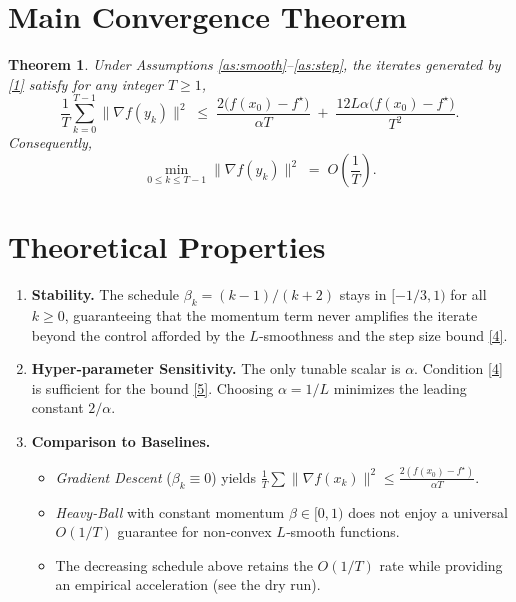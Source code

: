 \documentclass[11pt]{article}
\newtheorem{theorem}{Theorem}
\begin{document}
\section*{Main Convergence Theorem}
\begin{theorem}\label{thm:main}
Under Assumptions \ref{as:smooth}–\ref{as:step}, the iterates generated by \eqref{1} satisfy for any integer $T\ge1$,
\[
\frac{1}{T}\sum_{k=0}^{T-1}\bigl\|\nabla f(y_k)\bigr\|^{2}
\;\le\;
\frac{2\bigl(f(x_0)-f^\star\bigr)}{\alpha T}
\;+\;
\frac{12L\alpha\bigl(f(x_0)-f^\star\bigr)}{T^{2}} .
\tag{5}
\]
Consequently,
\[
\min_{0\le k\le T-1}\bigl\|\nabla f(y_k)\bigr\|^{2}
\;=\;O\!\left(\frac{1}{T}\right).
\]
\end{theorem}

\section*{Theoretical Properties}
\begin{enumerate}[label=\arabic*.]
\item \textbf{Stability.} The schedule $\beta_k=(k-1)/(k+2)$ stays in $[-1/3,1)$ for all $k\ge0$, guaranteeing that the momentum term never amplifies the iterate beyond the control afforded by the $L$‑smoothness and the step size bound \eqref{4}.

\item \textbf{Hyper‑parameter Sensitivity.} The only tunable scalar is $\alpha$. Condition \eqref{4} is sufficient for the bound \eqref{5}. Choosing $\alpha=1/L$ minimizes the leading constant $2/\alpha$.

\item \textbf{Comparison to Baselines.}
    \begin{itemize}
        \item \emph{Gradient Descent} ($\beta_k\equiv0$) yields $\frac{1}{T}\sum\|\nabla f(x_k)\|^2\le \frac{2(f(x_0)-f^\star)}{\alpha T}$.
        \item \emph{Heavy‑Ball} with constant momentum $\beta\in[0,1)$ does not enjoy a universal $O(1/T)$ guarantee for non‑convex $L$‑smooth functions.
        \item The decreasing schedule above retains the $O(1/T)$ rate while providing an empirical acceleration (see the dry run).
    \end{itemize}
\end{enumerate}
\end{document}
